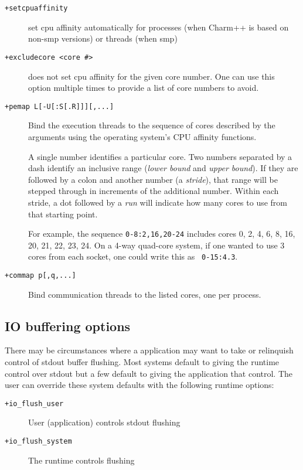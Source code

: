 \begin{description}

\item[{\tt +setcpuaffinity}]             set cpu affinity automatically for processes (when Charm++ is based on non-smp versions) or threads (when smp)

\item[{\tt +excludecore <core \#>}]       does not set cpu affinity for the given core number. One can use this option multiple times to provide a list of core numbers to avoid.

\item[{\tt +pemap L[-U[:S[.R]]][,...]}] Bind the execution threads to
  the sequence of cores described by the arguments using the operating
  system's CPU affinity functions.

A single number identifies a particular core. Two numbers separated by
a dash identify an inclusive range (\emph{lower bound} and \emph{upper
  bound}). If they are followed by a colon and another number (a
\emph{stride}), that range will be stepped through in increments of
the additional number. Within each stride, a dot followed by a
\emph{run} will indicate how many cores to use from that starting
point.

For example, the sequence {\tt 0-8:2,16,20-24} includes cores 0, 2, 4,
6, 8, 16, 20, 21, 22, 23, 24. On a 4-way quad-core system, if one
wanted to use 3 cores from each socket, one could write this as {\tt
  0-15:4.3}.

\item[{\tt +commap p[,q,...]}] Bind communication threads to the
  listed cores, one per process.

\end{description}

\subsection{IO buffering options}
\label{io buffer options}
There may be circumstances where a \charmpp{} application may want to take
or relinquish control of stdout buffer flushing. Most systems default to
giving the \charmpp{} runtime control over stdout but a few default to
giving the application that control. The user can override these system
defaults with the following runtime options:

\begin{description}
\item[{\tt +io\_flush\_user}]     User (application) controls stdout flushing
\item[{\tt +io\_flush\_system}]   The \charmpp{} runtime controls flushing
\end{description}


